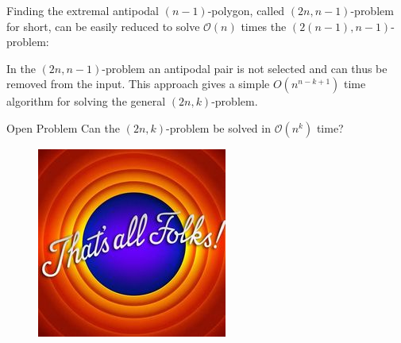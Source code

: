 \documentclass{beamer}
\begin{document}
\begin{frame}
Finding the extremal antipodal $(n-1)$-polygon, called $(2n, n-1)$-problem for short, can be easily
reduced to solve $\mathcal{O}(n)$ times the $(2(n - 1), n - 1)$-problem: \pause
\vspace{0.5cm}

In the $(2n, n - 1)$-problem an antipodal pair is not selected and can thus be removed
from the input. This approach gives a simple $O(n^{n-k+1})$ time algorithm for solving
the general $(2n, k)$-problem.\pause
\vspace{0.5cm}

\begin{alertblock}{Open Problem}
Can the $(2n,k)$-problem be solved in $\mathcal{O}(n^k)$ time?
\end{alertblock}

\end{frame}

\begin{frame}
\begin{figure}
\includegraphics[scale=1]{folks}
\end{figure}
\end{frame}
\end{document}
